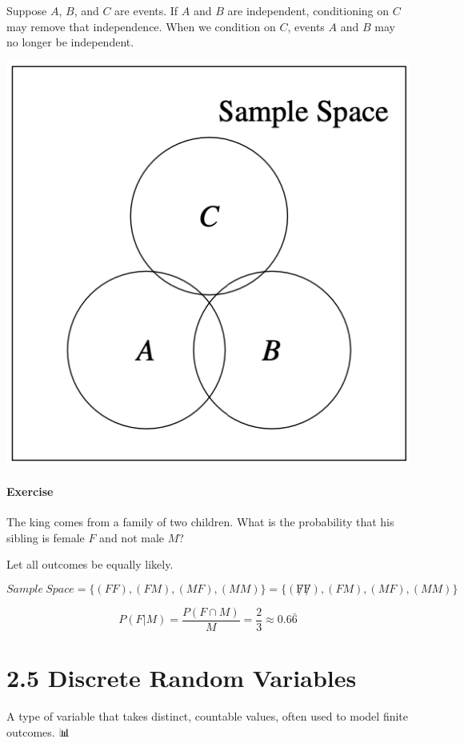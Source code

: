 \documentclass[
  letterpaper,
  DIV=11,
  numbers=noendperiod]{scrreprt}
\begin{document}
Suppose \(A\), \(B\), and \(C\) are events. If \(A\) and \(B\) are
independent, conditioning on \(C\) may remove that independence. When we
condition on \(C\), events \(A\) and \(B\) may no longer be independent.

\includegraphics[width=0.3\linewidth,height=\textheight,keepaspectratio]{lecture2/images/condind.png}

\subsubsection{Exercise}\label{exercise-7}

The king comes from a family of two children. What is the probability
that his sibling is female \(F\) and not male \(M\)?

Let all outcomes be equally likely.

\begin{tcolorbox}[enhanced jigsaw, toprule=.15mm, leftrule=.75mm, coltitle=black, left=2mm, opacityback=0, titlerule=0mm, arc=.35mm, toptitle=1mm, opacitybacktitle=0.6, bottomtitle=1mm, colframe=quarto-callout-tip-color-frame, title=\textcolor{quarto-callout-tip-color}{\faLightbulb}\hspace{0.5em}{Solution}, rightrule=.15mm, bottomrule=.15mm, colbacktitle=quarto-callout-tip-color!10!white, breakable, colback=white]

\[
Sample \ Space = \{(FF), (FM), (MF), (MM)\} = \{(\not F \not F), (FM), (MF), (MM)\}
\]

\[
P(F|M) = \frac{P(F \cap M)}{M} = \frac{2}{3} \approx 0.6\bar{6}
\]

\end{tcolorbox}

\chapter{2.5 Discrete Random Variables}\label{discrete-random-variables}

\begin{tcolorbox}[enhanced jigsaw, arc=.35mm, toprule=.15mm, leftrule=.75mm, colback=white, left=2mm, colframe=quarto-callout-note-color-frame, rightrule=.15mm, opacityback=0, breakable, bottomrule=.15mm]

A type of variable that takes distinct, countable values, often used to
model finite outcomes. 📊

\end{tcolorbox}
\end{document}
